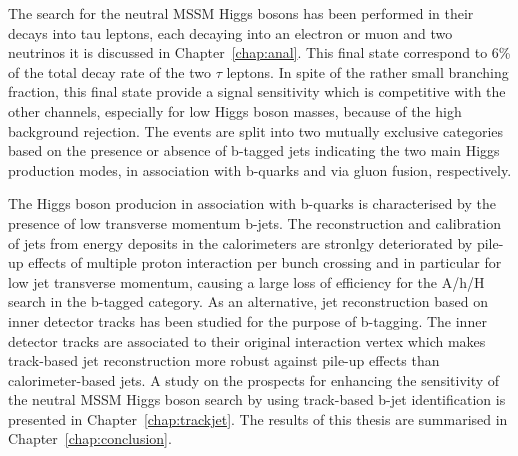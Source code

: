 The search for the neutral MSSM Higgs bosons has been performed in their decays into tau leptons,
each decaying into an electron or muon and two neutrinos it is discussed in Chapter~\ref{chap:anal}.
This final state correspond to 6\% of the total decay rate of the two $\tau$ leptons. 
In spite of the  rather small branching fraction, this final state provide a signal 
sensitivity which is competitive with the other channels, especially
for low Higgs boson masses, because of the high background rejection.
The  events are split into two mutually exclusive categories based on the presence or
absence of b-tagged jets indicating the two main Higgs production modes,
in association with b-quarks and via gluon fusion, respectively.

The Higgs boson producion in association with b-quarks is characterised by the presence of low 
transverse momentum b-jets.
The reconstruction and calibration of jets from energy deposits in the calorimeters are stronlgy 
deteriorated by pile-up effects of multiple proton interaction per bunch crossing and 
in particular for low jet transverse momentum, causing a large loss of efficiency for the A/h/H search
in the b-tagged category. As an alternative, jet reconstruction based on inner detector 
tracks has been studied for the purpose of b-tagging.
The inner detector tracks are associated to their original interaction vertex which 
makes track-based jet reconstruction more robust against pile-up effects than calorimeter-based jets. 
A study on the prospects for enhancing the sensitivity of the neutral MSSM 
Higgs boson search  by using track-based b-jet identification is presented in Chapter~\ref{chap:trackjet}.
The results of this thesis are summarised in Chapter~\ref{chap:conclusion}.











